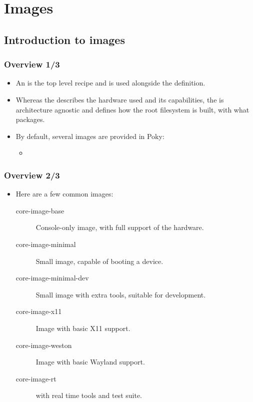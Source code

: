 \section{Images}
\subsection{Introduction to images}

\begin{frame}
  \frametitle{Overview 1/3}
  \begin{itemize}
    \item An  is the top level recipe and is used
      alongside the  definition.
    \item Whereas the  describes the hardware used and
      its capabilities, the  is architecture agnostic and
      defines how the root filesystem is built, with what packages.
    \item By default, several images are provided in Poky:
      \begin{itemize}
        \item {}
      \end{itemize}
  \end{itemize}
\end{frame}

\begin{frame}
  \frametitle{Overview 2/3}
  \begin{itemize}
    \item Here are a few common images:
      \begin{description}
        \item[core-image-base] Console-only image, with full support
          of the hardware.
        \item[core-image-minimal] Small image, capable of booting a
          device.
        \item[core-image-minimal-dev] Small image with extra tools,
          suitable for development.
        \item[core-image-x11] Image with basic X11 support.
        \item[core-image-weston] Image with basic Wayland support.
        \item[core-image-rt]  with real time
          tools and test suite.
      \end{description}
  \end{itemize}
\end{frame}

